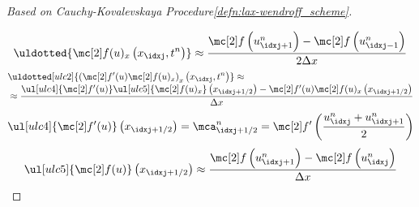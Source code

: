 \begin{proofbox}
\begin{proof}[\newline Based on \textit{Cauchy-Kovalevskaya Procedure}\cref{defn:lax-wendroff_scheme}]
\begin{align*}
        \end{align*}
        \begin{align*}
          \uldotted{\flux(u)_{x} \left(x_{\idxj},t^{n}\right)}\approx\frac{\flux \left(u_{\idxj+1}^{n}\right)-\flux \left(u_{\idxj-1}^{n}\right)}{2\Delta x}
        \end{align*}
        \begin{align*}
          &\uldotted[ulc2]{\left(\flux'(u)\flux(u)_{x}\right)_{x} \left(x_{\idxj},t^{n}\right)}\approx \\[-1\jot]
          &\approx
          \frac{\ul[ulc4]{\flux'(u)}\ul[ulc5]{\flux(u)_{x}}\left(x_{\idxj+1/2}\right)-\flux'(u)\flux(u)_{x}\left(x_{\idxj+1/2}\right)}{\Delta x}
        \end{align*}
        \begin{align*}
          \ul[ulc4]{\flux'(u)}\left(x_{\idxj+1/2}\right)=\mca_{\idxj+1/2}^{n}
          =\flux' \left(\frac{u_{\idxj}^{n}+u_{\idxj+1}^{n}}{2}\right)
        \end{align*}
        \begin{align*}
          \ul[ulc5]{\flux(u)}\left(x_{\idxj+1/2}\right)\approx
          \frac{\flux \left(u_{\idxj+1}^{n}\right)-\flux \left(u_{\idxj}^{n}\right)}{\Delta x}
        \end{align*}
    \end{proof}
\end{proofbox}
